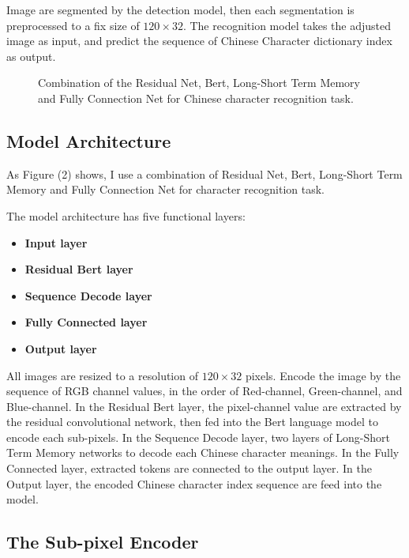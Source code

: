\documentclass[review]{cvpr}
\begin{document}
  Image are segmented by the detection model, then each segmentation is preprocessed to a fix size of $120\times32$.
The recognition model takes the adjusted image as input, and predict the sequence of Chinese Character dictionary index as output.


\begin{figure*}
\begin{center}
\end{center}
   \caption{Combination of the Residual Net, Bert, Long-Short Term Memory and Fully Connection Net for Chinese character recognition task.}
\label{fig:short}
\end{figure*}

\subsection{Model Architecture}

 As Figure (2) shows, I use a combination of Residual Net, Bert, Long-Short Term Memory and Fully Connection Net for character recognition task.

The model architecture has five functional layers:

\begin{itemize}
\item {\bf Input layer}
\item {\bf Residual Bert layer}
\item {\bf Sequence Decode layer}
\item {\bf Fully Connected layer}
\item {\bf Output layer}
\end{itemize}

All images are resized to a resolution of $120\times32$ pixels.
Encode the image by the sequence of RGB channel values, in the order of Red-channel, Green-channel, and Blue-channel.
In the Residual Bert  layer, the pixel-channel value are extracted by the residual convolutional network,
then fed into the Bert language model to encode each sub-pixels.
In the Sequence Decode layer, two layers of Long-Short Term Memory networks to decode each Chinese character meanings.
In the Fully Connected layer, extracted tokens are connected to the output layer.
In the Output layer, the encoded Chinese character index sequence are feed into the model.


\subsection{The Sub-pixel Encoder}
\end{document}
